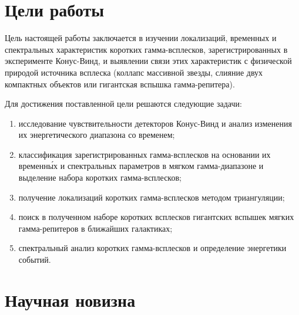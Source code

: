 \section*{Цели работы}
Цель настоящей работы заключается в изучении локализаций, временных и спектральных характеристик 
коротких гамма-всплесков, зарегистрированных в эксперименте Конус-Винд, и выявлении 
связи этих характеристик с физической природой источника всплеска 
(коллапс массивной звезды, слияние двух компактных объектов или гигантская вспышка гамма-репитера).

Для достижения поставленной цели решаются следующие задачи:
\begin{enumerate}
\item исследование чувствительности детекторов Конус-Винд и анализ изменения 
их энергетического диапазона со временем;
\item классификация зарегистрированных гамма-всплесков на основании их временн\'{ы}х 
и спектральных параметров в мягком гамма-диапазоне и выделение набора коротких гамма-всплесков; 
\item получение локализаций коротких гамма-всплесков методом триангуляции; 
\item поиск в полученном наборе коротких всплесков гигантских 
вспышек мягких гамма-репитеров в ближайших галактиках;
\item спектральный анализ коротких гамма-всплесков и определение энергетики событий.
\end{enumerate}

\section*{Научная новизна}

